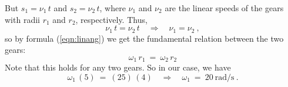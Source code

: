 \begin{exmp}
 But $s_1 = \nu_1 \,t$ and $s_2 = \nu_2 \,t$, where $\nu_1$ and $\nu_2$ are the linear speeds of the
 gears with radii $r_1$ and $r_2$, respectively. Thus,
 \begin{displaymath}
  \nu_1 \,t = \nu_2 \,t \quad\Rightarrow\quad \nu_1 = \nu_2 ~, 
 \end{displaymath}
 so by formula (\ref{eqn:linang}) we get the fundamental relation between the two gears:
 \begin{equation}
  \boxed{\omega_1 \,r_1 ~=~ \omega_2 \,r_2}\label{eqn:gears}
 \end{equation}
 Note that this holds for any two gears. So in our case, we have
 \begin{displaymath}
  \omega_1 \,(5) ~=~ (25) \,(4) \quad\Rightarrow\quad \boxed{\omega_1 ~=~ 20~\text{rad/s}} ~.
 \end{displaymath}
\end{exmp}
\divider
\vspace{2mm}

